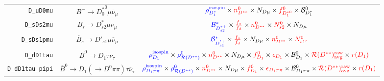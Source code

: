 \begin{landscape}
\begin{table}
\begin{tabular}{r|c|c}
        \texttt{D\_uD0mu} &                  $B^- \rightarrow {D^*_0}^0 \mu \overline{\nu}_\mu$                  &                                                                                                     $\textcolor{blue}{\rho^\text{isospin}_{D_1^*}} \times \textcolor{red}{n^{0}_{D^{**}}} \times N_{D \mu} \times \textcolor{red}{f^{0}_{D_1^{*0}}} \times \mathcal{B}^{0}_{D_1^*}$                                                                                                      \\
       \texttt{D\_sDs2mu} &             $\overline{B}_s \rightarrow D_{s2}^* \mu \overline{\nu}_\mu$             &                                                                                                    $\textcolor{blue}{\mathcal{B}^{*}_{D_{s2}^{*+}}} \times \textcolor{red}{\frac{f_s}{f_d}} \times \textcolor{red}{n^{0}_{D^{**}}} \times \textcolor{red}{N^0_{s2}} \times N_{D \mu}$                                                                                                    \\
      \texttt{D\_sDs1pmu} &             $\overline{B}_s \rightarrow D'_{s1} \mu \overline{\nu}_\mu$              &                                                                                                   $\textcolor{blue}{\mathcal{B}^{*}_{D_{s1}^{'+}}} \times \textcolor{red}{\frac{f_s}{f_d}} \times N_{D \mu} \times \textcolor{red}{n^{0}_{D^{**}}} \times \textcolor{red}{N^0_{s1'}}$                                                                                                    \\
       \texttt{D\_dD1tau} &              $\overline{B}^0 \rightarrow D_1 \tau \overline{\nu}_\tau$               &          $\textcolor{blue}{\rho^\text{isospin}_{D_1}} \times \textcolor{blue}{\rho_{\mathcal{R}(D^{**})}^0} \times \textcolor{red}{n^{0}_{D^{**}}} \times N_{D \mu} \times \textcolor{red}{f^{0}_{D_1}} \times \textcolor{red}{\epsilon_{D_1}} \times \mathcal{B}^{0}_{D_1} \times \textcolor{red}{\mathcal{R}(D^{**})_\text{avg}^\text{raw}} \times \textcolor{red}{r({D_1})}$          \\
 \texttt{D\_dD1tau\_pipi} &  $\overline{B}^0 \rightarrow D_1 (\rightarrow D^0 \pi\pi) \tau \overline{\nu}_\tau$  & $\textcolor{blue}{\rho^\text{isospin}_{D_1\pi\pi}} \times \textcolor{blue}{\rho_{\mathcal{R}(D^{**})}^0} \times \textcolor{red}{n^{0}_{D^{**}}} \times N_{D \mu} \times \textcolor{red}{f^{0}_{D_1}} \times \textcolor{red}{\epsilon_{D_1\pi\pi}} \times \mathcal{B}^{0}_{D_1\pi\pi} \times \textcolor{red}{\mathcal{R}(D^{**})_\text{avg}^\text{raw}} \times \textcolor{red}{r({D_1})}$ \\

\end{tabular}
\end{table}
\end{landscape}

